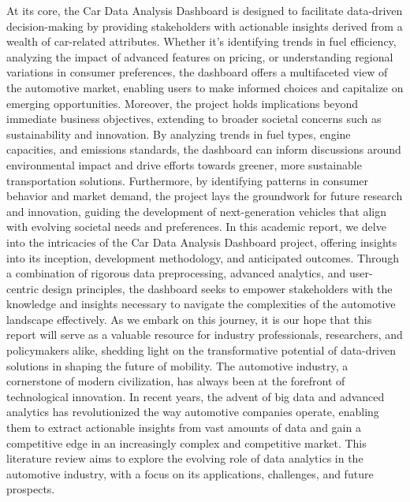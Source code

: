 \documentclass{article}
\begin{document}
{At its core, the Car Data Analysis Dashboard is designed to facilitate data-driven decision-making by providing stakeholders with actionable insights derived from a wealth of car-related attributes. Whether it's identifying trends in fuel efficiency, analyzing the impact of advanced features on pricing, or understanding regional variations in consumer preferences, the dashboard offers a multifaceted view of the automotive market, enabling users to make informed choices and capitalize on emerging opportunities.
\newline
Moreover, the project holds implications beyond immediate business objectives, extending to broader societal concerns such as sustainability and innovation. By analyzing trends in fuel types, engine capacities, and emissions standards, the dashboard can inform discussions around environmental impact and drive efforts towards greener, more sustainable transportation solutions. Furthermore, by identifying patterns in consumer behavior and market demand, the project lays the groundwork for future research and innovation, guiding the development of next-generation vehicles that align with evolving societal needs and preferences.
\newline
\newline
In this academic report, we delve into the intricacies of the Car Data Analysis Dashboard project, offering insights into its inception, development methodology, and anticipated outcomes. Through a combination of rigorous data preprocessing, advanced analytics, and user-centric design principles, the dashboard seeks to empower stakeholders with the knowledge and insights necessary to navigate the complexities of the automotive landscape effectively. As we embark on this journey, it is our hope that this report will serve as a valuable resource for industry professionals, researchers, and policymakers alike, shedding light on the transformative potential of data-driven solutions in shaping the future of mobility.
\newline
\newline
The automotive industry, a cornerstone of modern civilization, has always been at the forefront of technological innovation. In recent years, the advent of big data and advanced analytics has revolutionized the way automotive companies operate, enabling them to extract actionable insights from vast amounts of data and gain a competitive edge in an increasingly complex and competitive market. This literature review aims to explore the evolving role of data analytics in the automotive industry, with a focus on its applications, challenges, and future prospects.
}
\end{document}
